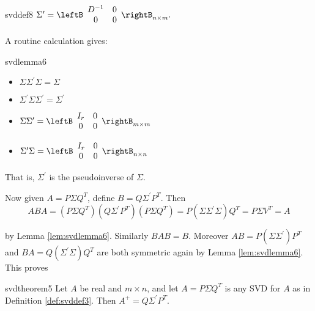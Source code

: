 \begin{definition}{}{svddef8} 
$\Sigma^{\prime }=
\leftB 
\begin{array}{cc}
D^{-1} & 0 \\ 
0 & 0
\end{array}
\rightB_{n\times m}.$
\end{definition}

\noindent A routine calculation gives:

\begin{lemma}{}{svdlemma6}
\begin{multicols}{2}
\begin{itemize}
\item $\Sigma \Sigma^{\prime }\Sigma =\Sigma$
\item $\Sigma^{\prime }\Sigma \Sigma^{\prime }=\Sigma^{\prime }$
\columnbreak
\item $\Sigma \Sigma^{\prime }= 
\leftB 
\begin{array}{cc}
I_{r} & 0 \\ 
0 & 0
\end{array}
\rightB_{m\times m}$
\item $\Sigma^{\prime }\Sigma =
\leftB 
\begin{array}{cc}
I_{r} & 0 \\ 
0 & 0
\end{array}
\rightB_{n\times n}$
\end{itemize}
\end{multicols}
\vspace*{0.1em}
\end{lemma}

\noindent That is, $\Sigma^{\prime }$ is the pseudoinverse of $\Sigma$.

Now given $A=P\Sigma Q^{T}$, define $B=Q\Sigma^{\prime }P^{T}$. Then
\begin{equation*}
ABA=(P\Sigma Q^{T})(Q\Sigma^{\prime }P^{T})(P\Sigma Q^{T})=P(\Sigma
\Sigma^{\prime }\Sigma )Q^{T}=P\Sigma V^{T}=A
\end{equation*}

\noindent by Lemma \ref{lem:svdlemma6}. Similarly $BAB=B$. Moreover $AB=P(\Sigma \Sigma^{\prime })P^{T}$ and $BA=Q(\Sigma^{\prime }\Sigma )Q^{T}$ are both
symmetric again by Lemma \ref{lem:svdlemma6}. This proves

\begin{theorem}{}{svdtheorem5}
Let $A$ be real and $m\times n$, and let $A=P\Sigma Q^{T}$ is any SVD for $A$ as in Definition \ref{def:svddef3}. Then $A^{+}=Q\Sigma^{\prime }P^{T}$.
\end{theorem}

